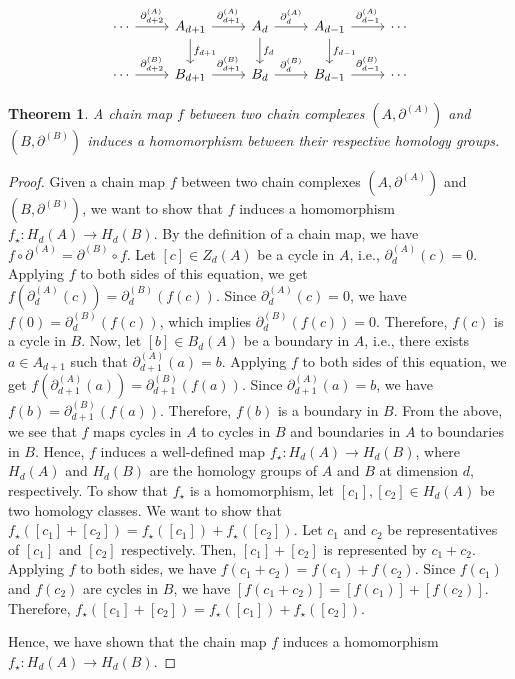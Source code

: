 \documentclass{amsart}
\newtheorem{theorem}[section]{Theorem}
\begin{document}
\begin{equation}
\begin{tikzcd}
\cdots \arrow[r, "\partial^{(A)}_{d+2}"] & A_{d+1} \arrow[r, "\partial^{(A)}_{d+1}"] \arrow[d, "f_{d+1}"] & A_d \arrow[r, "\partial^{(A)}_{d}"] \arrow[d, "f_d"] & A_{d-1} \arrow[r, "\partial^{(A)}_{d-1}"] \arrow[d, "f_{d-1}"] & \cdots \\
\cdots \arrow[r, "\partial^{(B)}_{d+2}"] & B_{d+1} \arrow[r, "\partial^{(B)}_{d+1}"]                                  & B_d \arrow[r, "\partial^{(B)}_d"]                              & B_{d-1} \arrow[r, "\partial^{(B)}_{d-1}"]                                  & \cdots
\end{tikzcd}
\end{equation}

\begin{theorem}
\label{chainmaps}
A chain map $f$ between two chain complexes $(A, \partial^{(A)})$ and $(B,\partial^{(B)})$ induces a homomorphism between their respective homology groups.
\end{theorem}

\begin{proof}
Given a chain map $f$ between two chain complexes $(A, \partial^{(A)})$ and $(B,\partial^{(B)})$, we want to show that $f$ induces a homomorphism $f_\star: H_d(A) \rightarrow H_d(B)$. By the definition of a chain map, we have $f \circ \partial^{(A)} = \partial^{(B)} \circ f$. Let $[c] \in Z_d(A)$ be a cycle in $A$, i.e., $\partial^{(A)}_d(c) = 0$. Applying $f$ to both sides of this equation, we get $f(\partial^{(A)}_d(c)) = \partial^{(B)}_d(f(c))$. Since $\partial^{(A)}_d(c) = 0$, we have $f(0) = \partial^{(B)}_d(f(c))$, which implies $\partial^{(B)}_d(f(c)) = 0$. Therefore, $f(c)$ is a cycle in $B$. Now, let $[b] \in B_d(A)$ be a boundary in $A$, i.e., there exists $a \in A_{d+1}$ such that $\partial^{(A)}_{d+1}(a) = b$. Applying $f$ to both sides of this equation, we get $f(\partial^{(A)}_{d+1}(a)) = \partial^{(B)}_{d+1}(f(a))$. Since $\partial^{(A)}_{d+1}(a) = b$, we have $f(b) = \partial^{(B)}_{d+1}(f(a))$. Therefore, $f(b)$ is a boundary in $B$. From the above, we see that $f$ maps cycles in $A$ to cycles in $B$ and boundaries in $A$ to boundaries in $B$. Hence, $f$ induces a well-defined map $f_\star: H_d(A) \rightarrow H_d(B)$, where $H_d(A)$ and $H_d(B)$ are the homology groups of $A$ and $B$ at dimension $d$, respectively. To show that $f_\star$ is a homomorphism, let $[c_1], [c_2] \in H_d(A)$ be two homology classes. We want to show that $f_\star([c_1] + [c_2]) = f_\star([c_1]) + f_\star([c_2])$. Let $c_1$ and $c_2$ be representatives of $[c_1]$ and $[c_2]$ respectively. Then, $[c_1] + [c_2]$ is represented by $c_1 + c_2$. Applying $f$ to both sides, we have $f(c_1 + c_2) = f(c_1) + f(c_2)$. Since $f(c_1)$ and $f(c_2)$ are cycles in $B$, we have $[f(c_1 + c_2)] = [f(c_1)] + [f(c_2)]$. Therefore, $f_\star([c_1] + [c_2]) = f_\star([c_1]) + f_\star([c_2])$.

Hence, we have shown that the chain map $f$ induces a homomorphism $f_\star: H_d(A) \rightarrow H_d(B)$.
\end{proof}
\end{document}

